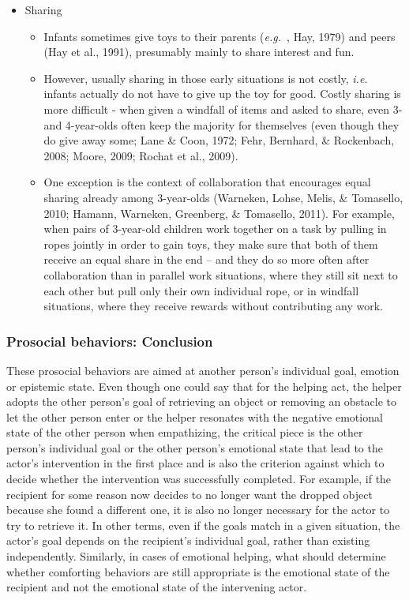\documentclass{article}
\newcommand{\ie}{{\textit{i.e.~}}}
\newcommand{\eg}{{\textit{e.g.~}}}
\begin{document}
\begin{itemize}
\item Sharing

	\begin{itemize}

	\item Infants sometimes give toys to their parents (\eg, Hay, 1979) and
	peers (Hay et al., 1991), presumably mainly to share interest and fun. 

	\item However, usually sharing in those early situations is not costly, \ie
	infants actually do not have to give up the toy for good. Costly sharing is
	more difficult {}- when given a windfall of items and asked to share, even
	3- and 4-year-olds often keep the majority for themselves (even though they
	do give away some; Lane \& Coon, 1972; Fehr, Bernhard, \& Rockenbach, 2008;
	Moore, 2009; Rochat et al., 2009). 

	\item One exception is the context of collaboration that encourages equal
	sharing already among 3-year-olds (Warneken, Lohse, Melis, \& Tomasello,
	2010; Hamann, Warneken, Greenberg, \& Tomasello, 2011). For example, when
	pairs of 3-year-old children work together on a task by pulling in ropes
	jointly in order to gain toys, they make sure that both of them receive an
	equal share in the end -- and they do so more often after collaboration
	than in parallel work situations, where they still sit next to each other
	but pull only their own individual rope, or in windfall situations, where
	they receive rewards without contributing any work. 

	\end{itemize}

\end{itemize}

\subsubsection{Prosocial behaviors: Conclusion}

These prosocial behaviors are aimed at another person{}'s individual goal,
emotion or epistemic state. Even though one could say that for the helping act,
the helper adopts the other person{}'s goal of retrieving an object or removing
an obstacle to let the other person enter or the helper resonates with the
negative emotional state of the other person when empathizing, the critical
piece is the other person{}'s individual goal or the other person{}'s emotional
state that lead to the actor{}'s intervention in the first place and is also
the criterion against which to decide whether the intervention was successfully
completed. For example, if the recipient for some reason now decides to no
longer want the dropped object because she found a different one, it is also no
longer necessary for the actor to try to retrieve it. In other terms, even if
the goals match in a given situation, the actor{}'s goal depends on the
recipient{}'s individual goal, rather than existing independently. Similarly,
in cases of emotional helping, what should determine whether comforting
behaviors are still appropriate is the emotional state of the recipient and not
the emotional state of the intervening actor.
\end{document}
